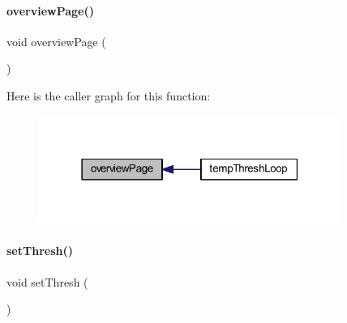 \paragraph{overview\+Page()}
{\footnotesize\ttfamily void overview\+Page (\begin{DoxyParamCaption}{ }\end{DoxyParamCaption})}

Here is the caller graph for this function\+:
\nopagebreak
\begin{figure}[H]
\begin{center}
\leavevmode
\includegraphics[width=279pt]{a00053_a9392b97d781ba354db0cc33d1f45c9f9_icgraph}
\end{center}
\end{figure}
\mbox{\label{a00053_a934f0cdada5e3c3460026cb93ed2c0e5}} 
\paragraph{set\+Thresh()}
{\footnotesize\ttfamily void set\+Thresh (\begin{DoxyParamCaption}{ }\end{DoxyParamCaption})}

